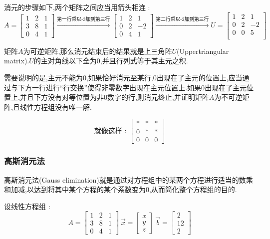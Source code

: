 \documentclass[UTF8,12pt]{ctexbook}
\begin{document}
{{{{{  消元的步骤如下,两个矩阵之间应当用箭头相连 :
  $$
    A = \begin{bmatrix}
      \boxed{1} & 2 & 1 \\
      3         & 8 & 1 \\
      0         & 4 & 1
    \end{bmatrix}
    \xrightarrow{\mbox{第一行乘以-3加到第三行}}
    \begin{bmatrix}
      \boxed{1} & 2         & 1  \\
      0         & \boxed{2} & -2 \\
      0         & 4         & 1
    \end{bmatrix}
    \xrightarrow{\mbox{第二行乘以-2加到第三行}}
    U = \begin{bmatrix}
      \boxed{1} & 2         & 1         \\
      0         & \boxed{2} & -2        \\
      0         & 0         & \boxed{5} \\
    \end{bmatrix}
  $$

  矩阵$A$为可逆矩阵,那么消元结束后的结果就是上三角阵$U$(Uppertriangular matrix).$U$的主对角线以下全为0,并且行列式等于其主元之积.

  需要说明的是,主元不能为$0$,如果恰好消元至某行,$0$出现在了主元的位置上,应当通过与下方一行进行“行交换”使得非零数字出现在主元位置上.如果$0$出现在了主元位置上,并且下方没有对等位置为非$0$数字的行,则消元终止,并证明矩阵$A$为不可逆矩阵,且线性方程组没有唯一解.

  $$
    \mbox{就像这样 : }\begin{bmatrix}
      * & * & * \\
      0 & * & * \\
      0 & 0 & 0
    \end{bmatrix}
  $$
}%

\subsubsection{高斯消元法}{
  高斯消元法(Gauss elimination)就是通过对方程组中的某两个方程进行适当的数乘和加减,以达到将其中某个方程的某个系数变为0,从而简化整个方程组的目的.

  设线性方程组 :
  $$
    A = \begin{bmatrix}
      1 & 2 & 1 \\
      3 & 8 & 1 \\
      0 & 4 & 1
    \end{bmatrix}
    \
    \vec{x} = \begin{bmatrix}
      x \\
      y \\
      z
    \end{bmatrix}
    \
    \vec{b} = \begin{bmatrix}
      2  \\
      12 \\
      2
    \end{bmatrix}
  $$

}}}}}
\end{document}
